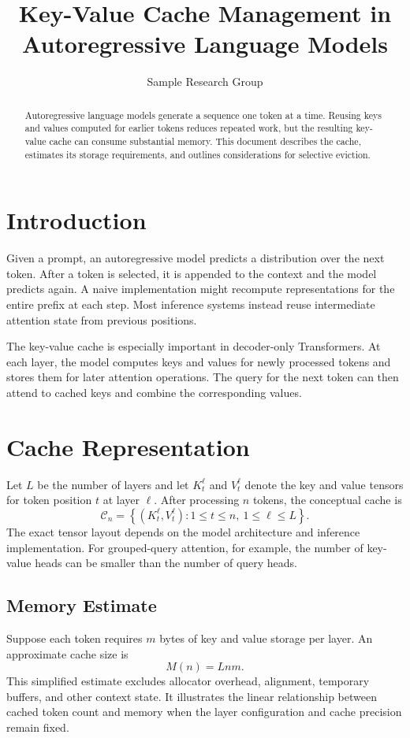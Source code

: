 \documentclass{article}
\title{Key-Value Cache Management in Autoregressive Language Models}
\author{Sample Research Group}
\date{}
\begin{document}
\maketitle

\begin{abstract}
Autoregressive language models generate a sequence one token at a time. Reusing keys and values computed for earlier tokens reduces repeated work, but the resulting key-value cache can consume substantial memory. This document describes the cache, estimates its storage requirements, and outlines considerations for selective eviction.
\end{abstract}

\section{Introduction}
Given a prompt, an autoregressive model predicts a distribution over the next token. After a token is selected, it is appended to the context and the model predicts again. A naive implementation might recompute representations for the entire prefix at each step. Most inference systems instead reuse intermediate attention state from previous positions.

The key-value cache is especially important in decoder-only Transformers. At each layer, the model computes keys and values for newly processed tokens and stores them for later attention operations. The query for the next token can then attend to cached keys and combine the corresponding values.

\section{Cache Representation}
Let $L$ be the number of layers and let $K_t^\ell$ and $V_t^\ell$ denote the key and value tensors for token position $t$ at layer $\ell$. After processing $n$ tokens, the conceptual cache is
\begin{equation}
\mathcal{C}_n =
\left\{(K_t^\ell,V_t^\ell):
1\leq t\leq n,\ 1\leq \ell\leq L\right\}.
\end{equation}
The exact tensor layout depends on the model architecture and inference implementation. For grouped-query attention, for example, the number of key-value heads can be smaller than the number of query heads.

\subsection{Memory Estimate}
Suppose each token requires $m$ bytes of key and value storage per layer. An approximate cache size is
\begin{equation}
M(n)=Lnm.
\end{equation}
This simplified estimate excludes allocator overhead, alignment, temporary buffers, and other context state. It illustrates the linear relationship between cached token count and memory when the layer configuration and cache precision remain fixed.
\end{document}
